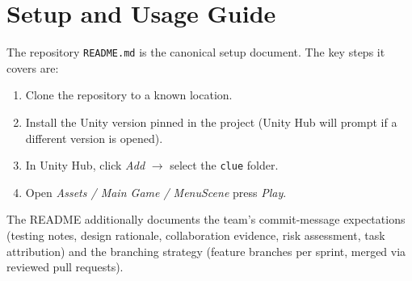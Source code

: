 \section{Setup and Usage Guide}

The repository \texttt{README.md} is the canonical setup document. The key
steps it covers are:

\begin{enumerate}
    \item Clone the repository to a known location.
    \item Install the Unity version pinned in the project (Unity Hub will
    prompt if a different version is opened).
    \item In Unity Hub, click \textit{Add} $\to$ select the \texttt{clue}
    folder.
    \item Open \textit{Assets / Main Game / MenuScene} 
    press \textit{Play}.
\end{enumerate}

\noindent The README additionally documents the team's commit-message
expectations (testing notes, design rationale, collaboration evidence, risk
assessment, task attribution) and the branching strategy (feature branches per
sprint, merged via reviewed pull requests).

\newpage
